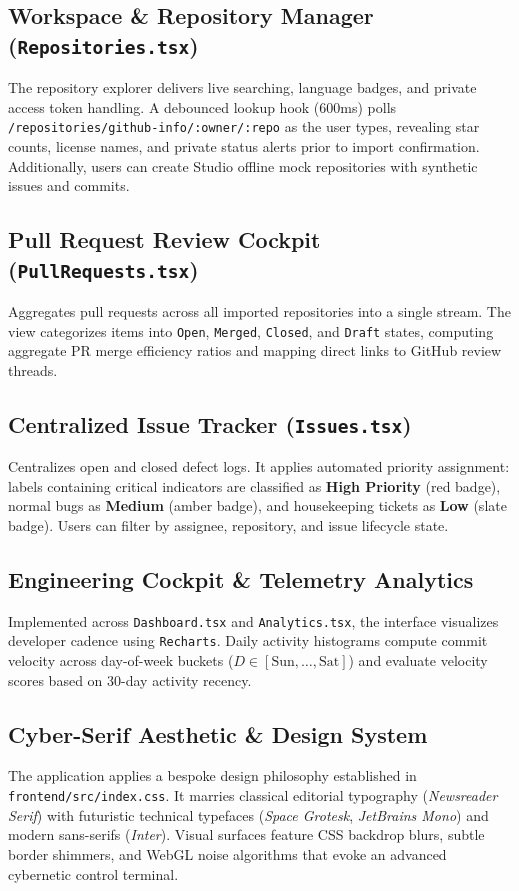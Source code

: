 \documentclass[conference]{IEEEtran}
\begin{document}
\subsection{Workspace \& Repository Manager (\texttt{Repositories.tsx})}
The repository explorer delivers live searching, language badges, and private access token handling. A debounced lookup hook (600ms) polls \texttt{/repositories/github-info/:owner/:repo} as the user types, revealing star counts, license names, and private status alerts prior to import confirmation. Additionally, users can create Studio offline mock repositories with synthetic issues and commits.

\subsection{Pull Request Review Cockpit (\texttt{PullRequests.tsx})}
Aggregates pull requests across all imported repositories into a single stream. The view categorizes items into \texttt{Open}, \texttt{Merged}, \texttt{Closed}, and \texttt{Draft} states, computing aggregate PR merge efficiency ratios and mapping direct links to GitHub review threads.

\subsection{Centralized Issue Tracker (\texttt{Issues.tsx})}
Centralizes open and closed defect logs. It applies automated priority assignment: labels containing critical indicators are classified as \textbf{High Priority} (red badge), normal bugs as \textbf{Medium} (amber badge), and housekeeping tickets as \textbf{Low} (slate badge). Users can filter by assignee, repository, and issue lifecycle state.

\subsection{Engineering Cockpit \& Telemetry Analytics}
Implemented across \texttt{Dashboard.tsx} and \texttt{Analytics.tsx}, the interface visualizes developer cadence using \texttt{Recharts}. Daily activity histograms compute commit velocity across day-of-week buckets ($D \in [\text{Sun}, \dots, \text{Sat}]$) and evaluate velocity scores based on 30-day activity recency.

\subsection{Cyber-Serif Aesthetic \& Design System}
The application applies a bespoke design philosophy established in \texttt{frontend/src/index.css}. It marries classical editorial typography (\textit{Newsreader Serif}) with futuristic technical typefaces (\textit{Space Grotesk}, \textit{JetBrains Mono}) and modern sans-serifs (\textit{Inter}). Visual surfaces feature CSS backdrop blurs, subtle border shimmers, and WebGL noise algorithms that evoke an advanced cybernetic control terminal.
\end{document}
